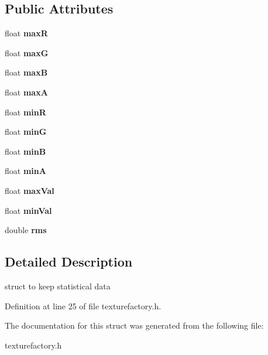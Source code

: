 \subsection*{Public Attributes}
\begin{DoxyCompactItemize}
\item 
float {\bfseries max\-R}\label{structsfs__visualizer_1_1Statistics_a92ab59196a4b4dce32eb9ef1a1b5f8be}

\item 
float {\bfseries max\-G}\label{structsfs__visualizer_1_1Statistics_a69ca010556d08541a3f8ce32250ec82c}

\item 
float {\bfseries max\-B}\label{structsfs__visualizer_1_1Statistics_ab8e57595c683f335b377e23a21fe8228}

\item 
float {\bfseries max\-A}\label{structsfs__visualizer_1_1Statistics_a1ec679a0f8d010f4068645a7797cccb6}

\item 
float {\bfseries min\-R}\label{structsfs__visualizer_1_1Statistics_a00dd9a42a30dba66453177f75e2ca467}

\item 
float {\bfseries min\-G}\label{structsfs__visualizer_1_1Statistics_afa70a68f883fe77f68f910758a6145ee}

\item 
float {\bfseries min\-B}\label{structsfs__visualizer_1_1Statistics_ada055908ce78ff1584e7f3b62b971674}

\item 
float {\bfseries min\-A}\label{structsfs__visualizer_1_1Statistics_ae52136da683d9d3df5df460e87a9b0e7}

\item 
float {\bfseries max\-Val}\label{structsfs__visualizer_1_1Statistics_adc567ac481a9557b7d88d6fc68c551a7}

\item 
float {\bfseries min\-Val}\label{structsfs__visualizer_1_1Statistics_ac4ae10537abe3ecf3ea4ad0d11d3394d}

\item 
double {\bfseries rms}\label{structsfs__visualizer_1_1Statistics_ad18cd2093740348629f12c160750125b}

\end{DoxyCompactItemize}


\subsection{Detailed Description}
struct to keep statistical data 

Definition at line 25 of file texturefactory.\-h.



The documentation for this struct was generated from the following file\-:\begin{DoxyCompactItemize}
\item 
texturefactory.\-h\end{DoxyCompactItemize}
